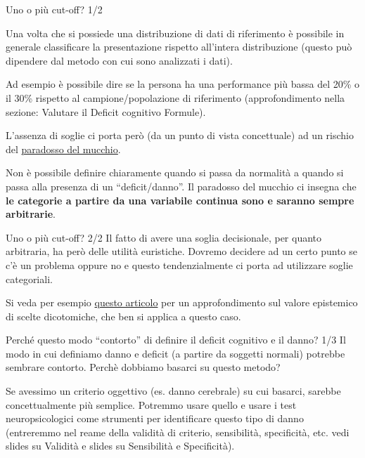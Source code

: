 \documentclass[
  ignorenonframetext,
]{beamer}
\begin{document}
\begin{frame}{Uno o più cut-off? 1/2}
\label{uno-o-piuxf9-cut-off-12}
\small

Una volta che si possiede una distribuzione di dati di riferimento è
possibile in generale classificare la presentazione rispetto all'intera
distribuzione (questo può dipendere dal metodo con cui sono analizzati i
dati).

Ad esempio è possibile dire se la persona ha una performance più bassa
del 20\% o il 30\% rispetto al campione/popolazione di riferimento
(approfondimento nella sezione: Valutare il Deficit cognitivo Formule).

L'assenza di soglie ci porta però (da un punto di vista concettuale) ad
un rischio del
\href{https://it.wikipedia.org/wiki/Paradosso_del_sorite}{\ul{paradosso
del mucchio}}.

Non è possibile definire chiaramente quando si passa da normalità a
quando si passa alla presenza di un ``deficit/danno''. Il paradosso del
mucchio ci insegna che \textbf{le categorie a partire da una variabile
continua sono e saranno sempre arbitrarie}.
\end{frame}

\begin{frame}{Uno o più cut-off? 2/2}
\label{uno-o-piuxf9-cut-off-22}
Il fatto di avere una soglia decisionale, per quanto arbitraria, ha però
delle utilità euristiche. Dovremo decidere ad un certo punto se c'è un
problema oppure no e questo tendenzialmente ci porta ad utilizzare
soglie categoriali.

Si veda per esempio
\href{https://journals.sagepub.com/doi/full/10.1177/09593543231160112}{questo
articolo} per un approfondimento sul valore epistemico di scelte
dicotomiche, che ben si applica a questo caso.
\end{frame}

\begin{frame}{Perché questo modo ``contorto'' di definire il deficit
cognitivo e il danno? 1/3}
\label{perchuxe9-questo-modo-contorto-di-definire-il-deficit-cognitivo-e-il-danno-13}
Il modo in cui definiamo danno e deficit (a partire da soggetti normali)
potrebbe sembrare contorto. Perchè dobbiamo basarci su questo metodo?

Se avessimo un criterio oggettivo (es. danno cerebrale) su cui basarci,
sarebbe concettualmente più semplice. Potremmo usare quello e usare i
test neuropsicologici come strumenti per identificare questo tipo di
danno (entreremmo nel reame della validità di criterio, sensibilità,
specificità, etc. vedi slides su Validità e slides su Sensibilità e
Specificità).
\end{frame}
\end{document}
